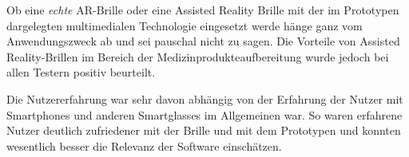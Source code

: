 Ob eine \emph{echte} AR-Brille oder eine Assisted Reality Brille mit der im Prototypen dargelegten multimedialen Technologie eingesetzt werde hänge ganz vom Anwendungszweck ab und sei pauschal nicht zu sagen. Die Vorteile von Assisted Reality-Brillen im Bereich der Medizinprodukteaufbereitung wurde jedoch bei allen Testern positiv beurteilt.

Die Nutzererfahrung war sehr davon abhängig von der Erfahrung der Nutzer mit Smartphones und anderen Smartglasses im Allgemeinen war. So waren erfahrene Nutzer deutlich zufriedener mit der Brille und mit dem Prototypen und konnten wesentlich besser die Relevanz der Software einschätzen. 